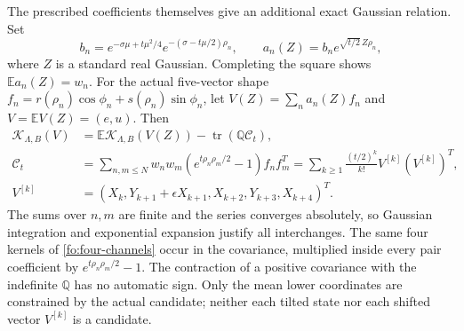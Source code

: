 \documentclass[11pt]{article}
\numberwithin{equation}{section}
\theoremstyle{definition}
\theoremstyle{remark}
\begin{document}
The prescribed coefficients themselves give an additional exact
Gaussian relation.  Set
\begin{equation}
b_n=e^{-\sigma\mu+t\mu^2/4}
          e^{-(\sigma-t\mu/2)\rho_n},\qquad
a_n(Z)=b_n e^{\sqrt{t/2}\,Z\rho_n},
\label{fo:Gaussian-tilt}
\end{equation}
where $Z$ is a standard real Gaussian.  Completing the square shows
$\mathbb Ea_n(Z)=w_n$.  For the actual five-vector shape
$f_n=r(\rho_n)\cos\phi_n+s(\rho_n)\sin\phi_n$, let
$V(Z)=\sum_na_n(Z)f_n$ and $V=\mathbb EV(Z)=(e,u)$.  Then
\begin{align}
\mathcal K_{\Lambda,B}(V)
 &=\mathbb E\mathcal K_{\Lambda,B}(V(Z))
                  -\operatorname{tr}(\mathbb Q\mathcal C_t),
 \label{fo:covariance}\\
\mathcal C_t
 &=\sum_{n,m\le N}w_nw_m
       (e^{t\rho_n\rho_m/2}-1)f_nf_m^T
 =\sum_{k\ge1}\frac{(t/2)^k}{k!}V^{[k]}(V^{[k]})^T,\nonumber\\
V^{[k]}
 &=\left(X_k,Y_{k+1}+\epsilon X_{k+1},
                      X_{k+2},Y_{k+3},X_{k+4}\right)^T.\nonumber
\end{align}
The sums over $n,m$ are finite and the series converges absolutely,
so Gaussian integration and exponential expansion justify all
interchanges.  The same four kernels of \eqref{fo:four-channels}
occur in the covariance, multiplied inside every pair coefficient by
$e^{t\rho_n\rho_m/2}-1$.  The contraction of a positive covariance
with the indefinite $\mathbb Q$ has no automatic sign.  Only the mean
lower coordinates are constrained by the actual candidate; neither
each tilted state nor each shifted vector $V^{[k]}$ is a candidate.
\end{document}
